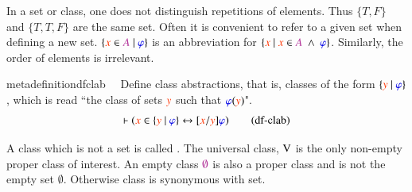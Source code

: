 \pn In a set or class, one does not distinguish repetitions of elements.  Thus \(\{T,F\}\) and \(\{T,T,F\}\) are the same set.
Often it is convenient to refer to a given set when defining a new set.
\(\{\msc{x}\in \mc{A}~\vert~ \mw{\varphi}\}\) is an abbreviation for \(\{\msc{x}~\vert~ \msc{x}\in \mc{A}~\wedge~\mw{\varphi}\}\).  Similarly, the order of elements is irrelevant.  


\begin{restatable}{metadefinition}{dfclab}~~ Define class abstractions, that is,
classes of the form $\{ \msc{y}~\vert~\mw{\varphi} \}$,
     which is read ``the class of sets $\msc{y}$ such that $\mw{\varphi} (
\msc{y} )$".  ~
\begin{align}
\vdash ( \msc{x} \in \{ \msc{y}~\vert~\mw{\varphi} \} \leftrightarrow [ \msc{x} /
    \msc{y} ] \mw{\varphi} )\label{eq:df-clab}\tag{df-clab}
\end{align}
\end{restatable}

\pn A class which is not a set is called .
The universal class, ${\rm V}$ is the only non-empty proper class of interest.  
An empty class $\emptyclass$ is also a proper class and is not the empty set $\emptyset$.
Otherwise class is synonymous with set.

\dfv*



